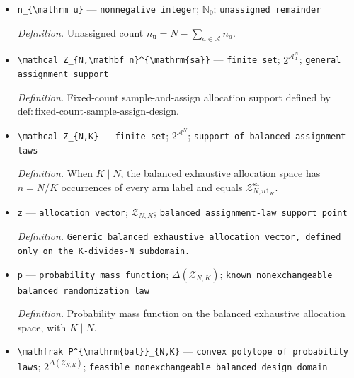 \documentclass{article}
\begin{document}
\begin{itemize}
  \par\smallskip\noindent\emph{Definition.} For the K-divides-N balanced exhaustive kernel problem, the universal identity-optimal cone at contrast Gram matrix \(H\).
  \item \texttt{n\_\allowbreak{}\{\textbackslash{}\allowbreak{}mathrm u\}\allowbreak{}} --- \texttt{nonnegative integer}; \(\mathbb N_0\); \texttt{unassigned remainder}
  \par\smallskip\noindent\emph{Definition.} Unassigned count \(n_{\mathrm u}=N-\sum_{a\in\mathcal A}n_a\).
  \item \texttt{\textbackslash{}\allowbreak{}mathcal Z\_\allowbreak{}\{N,\allowbreak{}\textbackslash{}\allowbreak{}mathbf n\}\allowbreak{}\textasciicircum{}\{\textbackslash{}\allowbreak{}mathrm\{sa\}\allowbreak{}\}\allowbreak{}} --- \texttt{finite set}; \(2^{\mathcal A_{\mathrm u}^N}\); \texttt{general assignment support}
  \par\smallskip\noindent\emph{Definition.} Fixed-count sample-and-assign allocation support defined by \(\mathrm{def{:}fixed\text{-}count\text{-}sample\text{-}assign\text{-}design}\).
  \item \texttt{\textbackslash{}\allowbreak{}mathcal Z\_\allowbreak{}\{N,\allowbreak{}K\}\allowbreak{}} --- \texttt{finite set}; \(2^{\mathcal A^N}\); \texttt{support of balanced assignment laws}
  \par\smallskip\noindent\emph{Definition.} When \(K\mid N\), the balanced exhaustive allocation space has \(n=N/K\) occurrences of every arm label and equals \(\mathcal Z_{N,n\mathbf 1_K}^{\mathrm{sa}}\).
  \item \texttt{z} --- \texttt{allocation vector}; \(\mathcal Z_{N,K}\); \texttt{balanced assignment-\allowbreak{}law support point}
  \par\smallskip\noindent\emph{Definition.} \texttt{Generic balanced exhaustive allocation vector,\allowbreak{} defined only on the K-\allowbreak{}divides-\allowbreak{}N subdomain.}
  \item \texttt{p} --- \texttt{probability mass function}; \(\Delta(\mathcal Z_{N,K})\); \texttt{known nonexchangeable balanced randomization law}
  \par\smallskip\noindent\emph{Definition.} Probability mass function on the balanced exhaustive allocation space, with \(K\mid N\).
  \item \texttt{\textbackslash{}\allowbreak{}mathfrak P\textasciicircum{}\{\textbackslash{}\allowbreak{}mathrm\{bal\}\allowbreak{}\}\allowbreak{}\_\allowbreak{}\{N,\allowbreak{}K\}\allowbreak{}} --- \texttt{convex polytope of probability laws}; \(2^{\Delta(\mathcal Z_{N,K})}\); \texttt{feasible nonexchangeable balanced design domain}

\end{itemize}
\end{document}
